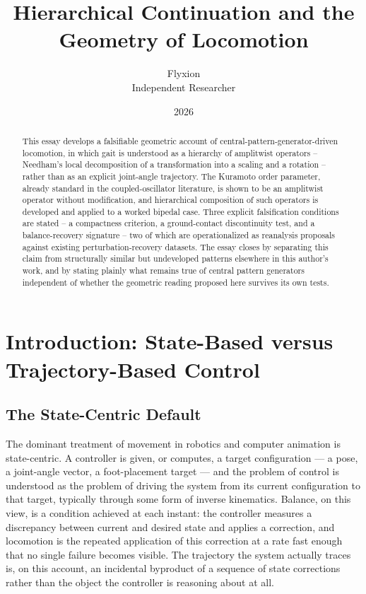 \documentclass[12pt]{article}
\title{Hierarchical Continuation and the Geometry of Locomotion}
\author{Flyxion \\ Independent Researcher}
\date{2026}
\begin{document}
\maketitle

\begin{abstract}
\noindent This essay develops a falsifiable geometric account of central-pattern-generator-driven locomotion, in which gait is understood as a hierarchy of amplitwist operators -- Needham's local decomposition of a transformation into a scaling and a rotation -- rather than as an explicit joint-angle trajectory. The Kuramoto order parameter, already standard in the coupled-oscillator literature, is shown to be an amplitwist operator without modification, and hierarchical composition of such operators is developed and applied to a worked bipedal case. Three explicit falsification conditions are stated -- a compactness criterion, a ground-contact discontinuity test, and a balance-recovery signature -- two of which are operationalized as reanalysis proposals against existing perturbation-recovery datasets. The essay closes by separating this claim from structurally similar but undeveloped patterns elsewhere in this author's work, and by stating plainly what remains true of central pattern generators independent of whether the geometric reading proposed here survives its own tests.
\end{abstract}

\tableofcontents
\newpage

\section{Introduction: State-Based versus Trajectory-Based Control}

\subsection{The State-Centric Default}

The dominant treatment of movement in robotics and computer animation is state-centric. A controller is given, or computes, a target configuration — a pose, a joint-angle vector, a foot-placement target — and the problem of control is understood as the problem of driving the system from its current configuration to that target, typically through some form of inverse kinematics. Balance, on this view, is a condition achieved at each instant: the controller measures a discrepancy between current and desired state and applies a correction, and locomotion is the repeated application of this correction at a rate fast enough that no single failure becomes visible. The trajectory the system actually traces is, on this account, an incidental byproduct of a sequence of state corrections rather than the object the controller is reasoning about at all.
\end{document}
